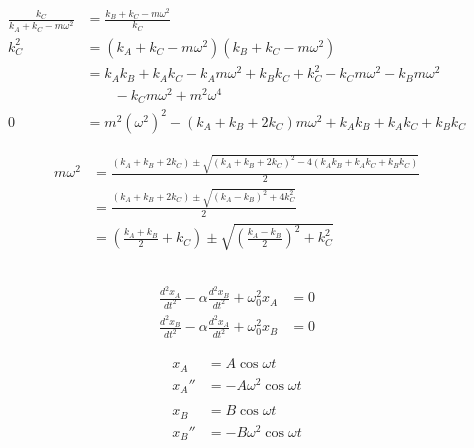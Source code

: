\documentclass{article}
\begin{document}
\begin{align*}
  \frac{k_C}{k_A + k_C - m \omega^2} & = \frac{k_B + k_C - m \omega^2}{k_C}                                                     \\
  k_C^2                              & = (k_A + k_C - m \omega^2) (k_B + k_C - m \omega^2)                                      \\
                                     & = k_A k_B + k_A k_C - k_A m \omega^2 + k_B k_C + k_C^2 - k_C m \omega^2 - k_B m \omega^2 \\
                                     & \qquad - k_C m \omega^2 + m^2 \omega^4                                                   \\
  0                                  & = m^2 (\omega^2)^2 - (k_A + k_B + 2 k_C) m \omega^2 + k_A k_B + k_A k_C + k_B k_C
\end{align*}

\begin{align*}
  m \omega^2 & = \frac{(k_A + k_B + 2 k_C) \pm \sqrt{(k_A + k_B + 2 k_C)^2 - 4 (k_A k_B + k_A k_C + k_B k_C)}}{2} \\
             & = \frac{(k_A + k_B + 2 k_C) \pm \sqrt{(k_A - k_B)^2 + 4 k_C^2}}{2}                                 \\
             & = \left( \frac{k_A + k_B}{2} + k_C \right) \pm \sqrt{\left( \frac{k_A - k_B}{2} \right)^2 + k_C^2}
\end{align*}

\subsection{}

\begin{align*}
  \frac{d^2 x_A}{d t^2} - \alpha \frac{d^2 x_B}{d t^2} + \omega_0^2 x_A & = 0 \\
  \frac{d^2 x_B}{d t^2} - \alpha \frac{d^2 x_A}{d t^2} + \omega_0^2 x_B & = 0
\end{align*}

\begin{align*}
  x_A   & = A \cos \omega t           \\
  x_A'' & = -A \omega^2 \cos \omega t \\ \\
  x_B   & = B \cos \omega t           \\
  x_B'' & = -B \omega^2 \cos \omega t
\end{align*}
\end{document}
